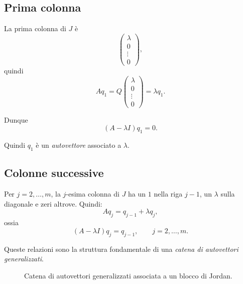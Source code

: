 \subsection{Prima colonna}

La prima colonna di $J$ è
\[
\begin{pmatrix}
\lambda\\
0\\
\vdots\\
0
\end{pmatrix},
\]
quindi
\[
Aq_1=Q
\begin{pmatrix}
\lambda\\
0\\
\vdots\\
0
\end{pmatrix}
=\lambda q_1.
\]

Dunque
\begin{equation}
(A-\lambda I)q_1=0.
\label{eq:L7_chain_first}
\end{equation}

Quindi $q_1$ è un \emph{autovettore} associato a $\lambda$.

\subsection{Colonne successive}

Per $j=2,\dots,m$, la $j$-esima colonna di $J$ ha un $1$ nella riga $j-1$, un $\lambda$ sulla diagonale e zeri altrove.  
Quindi:
\[
Aq_j=q_{j-1}+\lambda q_j,
\]
ossia
\begin{equation}
(A-\lambda I)q_j=q_{j-1},
\qquad j=2,\dots,m.
\label{eq:L7_chain_relation}
\end{equation}

Queste relazioni sono la struttura fondamentale di una \emph{catena di autovettori generalizzati}.

\begin{figure}[H]
\centering
{}
\caption{Catena di autovettori generalizzati associata a un blocco di Jordan.}
\end{figure}

